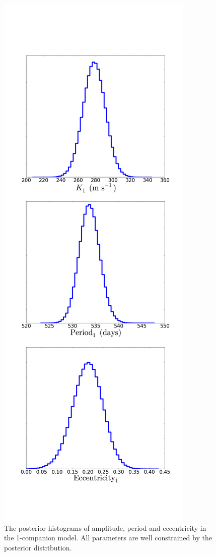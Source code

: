 \documentclass[letterpaper, preprint]{aastex}
\begin{document}
\begin{figure}
 \centering
 \includegraphics[width=0.45\linewidth]{282-1-hist.png}
 \caption{The posterior histograms of amplitude, period and eccentricity in the 1-companion model. All parameters are well constrained by the posterior distribution.}
 \label{fig:282-1-hist}
\end{figure}
\end{document}
